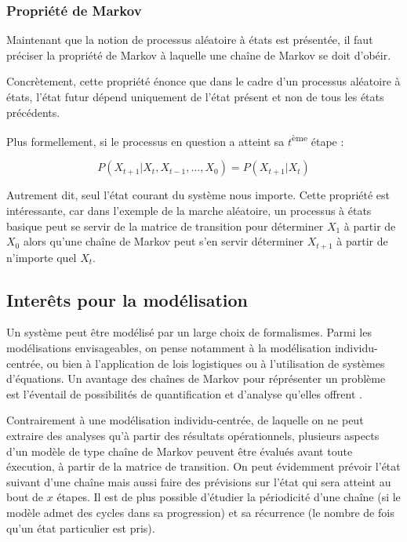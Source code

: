 \documentclass[12pt]{article}
\begin{document}
\subsubsection{Propriété de Markov}

Maintenant que la notion de processus aléatoire à états est présentée,
il faut préciser la propriété de Markov à laquelle une chaîne de
Markov se doit d'obéir.

Concrètement, cette propriété énonce que dans le cadre d'un processus
aléatoire à états, l'état futur dépend uniquement de l'état présent et
non de tous les états précédents.

Plus formellement, si le processus en question a atteint sa
$t$\textsuperscript{ème} étape :

$$
P(X_{t+1} | X_{t}, X_{t-1}, \dots, X_0) = P(X_{t+1} | X_t)
$$

Autrement dit, seul l'état courant du système nous importe. Cette
propriété est intéressante, car dans l'exemple de la marche aléatoire,
un processus à états basique peut se servir de la matrice de
transition pour déterminer $X_1$ à partir de $X_0$ alors qu'une chaîne
de Markov peut s'en servir déterminer $X_{t+1}$ à partir de n'importe
quel $X_t$.

\subsection{Interêts pour la modélisation}

Un système peut être modélisé par un large choix de formalismes. Parmi
les modélisations envisageables, on pense notamment à la modélisation
individu-centrée, ou bien à l'application de lois logistiques ou à
l'utilisation de systèmes d'équations. Un avantage des chaînes de
Markov pour réprésenter un problème est l'éventail de possibilités de
quantification et d'analyse qu'elles offrent \cite{izq}.

Contrairement à une modélisation individu-centrée, de laquelle on ne
peut extraire des analyses qu'à partir des résultats opérationnels,
plusieurs aspects d'un modèle de type chaîne de Markov peuvent être
évalués avant toute éxecution, à partir de la matrice de
transition. On peut évidemment prévoir l'état suivant d'une chaîne
mais aussi faire des prévisions sur l'état qui sera atteint au bout de
$x$ étapes. Il est de plus possible d'étudier la périodicité d'une
chaîne (si le modèle admet des cycles dans sa progression) et sa
récurrence (le nombre de fois qu'un état particulier est pris).
\end{document}
